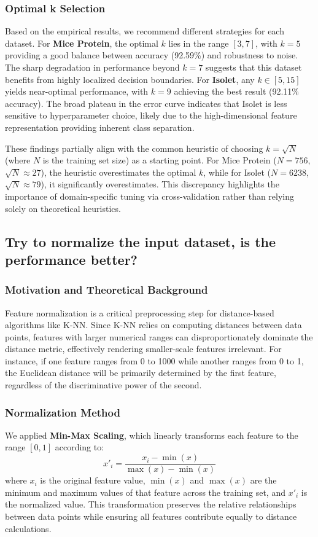 \documentclass[12pt]{article}
\begin{document}
\subsubsection{Optimal k Selection}
Based on the empirical results, we recommend different strategies for each dataset. For \textbf{Mice Protein}, the optimal $k$ lies in the range $[3, 7]$, with $k=5$ providing a good balance between accuracy (92.59\%) and robustness to noise. The sharp degradation in performance beyond $k=7$ suggests that this dataset benefits from highly localized decision boundaries. For \textbf{Isolet}, any $k \in [5, 15]$ yields near-optimal performance, with $k=9$ achieving the best result (92.11\% accuracy). The broad plateau in the error curve indicates that Isolet is less sensitive to hyperparameter choice, likely due to the high-dimensional feature representation providing inherent class separation.

These findings partially align with the common heuristic of choosing $k = \sqrt{N}$ (where $N$ is the training set size) as a starting point. For Mice Protein ($N=756$, $\sqrt{N} \approx 27$), the heuristic overestimates the optimal $k$, while for Isolet ($N=6238$, $\sqrt{N} \approx 79$), it significantly overestimates. This discrepancy highlights the importance of domain-specific tuning via cross-validation rather than relying solely on theoretical heuristics.

\subsection{Try to normalize the input dataset, is the performance better?}

\subsubsection{Motivation and Theoretical Background}
Feature normalization is a critical preprocessing step for distance-based algorithms like K-NN. Since K-NN relies on computing distances between data points, features with larger numerical ranges can disproportionately dominate the distance metric, effectively rendering smaller-scale features irrelevant. For instance, if one feature ranges from 0 to 1000 while another ranges from 0 to 1, the Euclidean distance will be primarily determined by the first feature, regardless of the discriminative power of the second.

\subsubsection{Normalization Method}
We applied \textbf{Min-Max Scaling}, which linearly transforms each feature to the range $[0, 1]$ according to:
\begin{equation}
    x'_i = \frac{x_i - \min(x)}{\max(x) - \min(x)}
\end{equation}
where $x_i$ is the original feature value, $\min(x)$ and $\max(x)$ are the minimum and maximum values of that feature across the training set, and $x'_i$ is the normalized value. This transformation preserves the relative relationships between data points while ensuring all features contribute equally to distance calculations.
\end{document}
